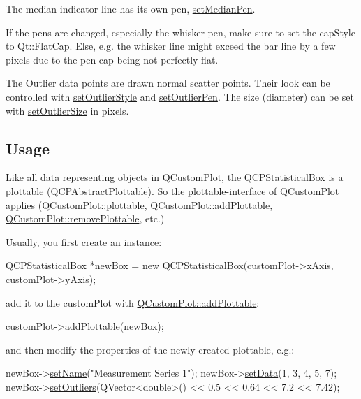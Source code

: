 The median indicator line has its own pen, \hyperlink{classQCPStatisticalBox_a7260ac55b669f5d0a74f16d5ca84c52c}{set\-Median\-Pen}.

If the pens are changed, especially the whisker pen, make sure to set the cap\-Style to Qt\-::\-Flat\-Cap. Else, e.\-g. the whisker line might exceed the bar line by a few pixels due to the pen cap being not perfectly flat.

The Outlier data points are drawn normal scatter points. Their look can be controlled with \hyperlink{classQCPStatisticalBox_a1cb2469552f6f6615b1f6d7398463e5c}{set\-Outlier\-Style} and \hyperlink{classQCPStatisticalBox_ac9079d5e27f1daf4d546f5a21246fc28}{set\-Outlier\-Pen}. The size (diameter) can be set with \hyperlink{classQCPStatisticalBox_ae784a5ea2da652e24445d36fbc0b0854}{set\-Outlier\-Size} in pixels.\hypertarget{classQCPStatisticalBox_usage}{}\subsection{Usage}\label{classQCPStatisticalBox_usage}
Like all data representing objects in \hyperlink{classQCustomPlot}{Q\-Custom\-Plot}, the \hyperlink{classQCPStatisticalBox}{Q\-C\-P\-Statistical\-Box} is a plottable (\hyperlink{classQCPAbstractPlottable}{Q\-C\-P\-Abstract\-Plottable}). So the plottable-\/interface of \hyperlink{classQCustomPlot}{Q\-Custom\-Plot} applies (\hyperlink{classQCustomPlot_a32de81ff53e263e785b83b52ecd99d6f}{Q\-Custom\-Plot\-::plottable}, \hyperlink{classQCustomPlot_ab7ad9174f701f9c6f64e378df77927a6}{Q\-Custom\-Plot\-::add\-Plottable}, \hyperlink{classQCustomPlot_af3dafd56884208474f311d6226513ab2}{Q\-Custom\-Plot\-::remove\-Plottable}, etc.)

Usually, you first create an instance\-: 
\begin{DoxyCode}
\hyperlink{classQCPStatisticalBox}{QCPStatisticalBox} *newBox = \textcolor{keyword}{new} \hyperlink{classQCPStatisticalBox_a75c2b3e7fcd0741cc981693a2ba63b27}{QCPStatisticalBox}(customPlot->xAxis, 
      customPlot->yAxis);
\end{DoxyCode}
 add it to the custom\-Plot with \hyperlink{classQCustomPlot_ab7ad9174f701f9c6f64e378df77927a6}{Q\-Custom\-Plot\-::add\-Plottable}\-: 
\begin{DoxyCode}
customPlot->addPlottable(newBox);
\end{DoxyCode}
 and then modify the properties of the newly created plottable, e.\-g.\-: 
\begin{DoxyCode}
newBox->\hyperlink{classQCPAbstractPlottable_ab79c7ba76bc7fa89a4b3580e12149f1f}{setName}(\textcolor{stringliteral}{"Measurement Series 1"});
newBox->\hyperlink{classQCPStatisticalBox_adf50c57b635edb12470c0e4a986aff37}{setData}(1, 3, 4, 5, 7);
newBox->\hyperlink{classQCPStatisticalBox_af9bc09620e0bf93bf444ee35e5800d1d}{setOutliers}(QVector<double>() << 0.5 << 0.64 << 7.2 << 7.42);
\end{DoxyCode}
 


